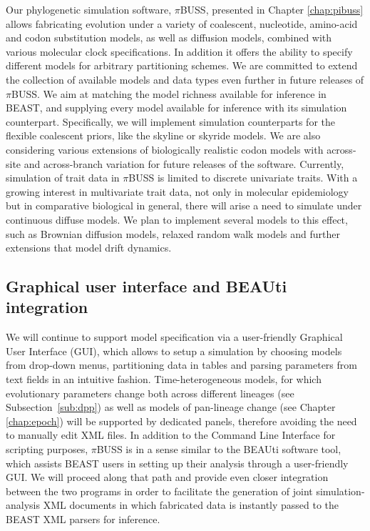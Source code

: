 Our phylogenetic simulation software, $\pi$BUSS, presented in Chapter \ref{chap:pibuss} allows fabricating evolution under a variety of coalescent, nucleotide, amino-acid and codon substitution models, as well as diffusion models, combined with various molecular clock specifications.
In addition it offers the ability to specify different models for arbitrary partitioning schemes.
We are committed to extend the collection of available models and data types even further in future releases of $\pi$BUSS.
We aim at matching the model richness available for inference in BEAST, and supplying every model available for inference with its simulation counterpart.
Specifically, we will implement simulation counterparts for the flexible coalescent priors, like the skyline \citep{Drummond2005} or skyride \citep{Minin2008b} models.
We are also considering various extensions of biologically realistic codon models with across-site and across-branch variation for future releases of the software.
Currently, simulation of trait data in $\pi$BUSS is limited to discrete univariate traits.
With a growing interest in multivariate trait data, not only in molecular epidemiology but in comparative biological in general, there will arise a need to simulate under continuous diffuse models.
We plan to implement several models to this effect, such as Brownian diffusion models, relaxed random walk models and further extensions that model drift dynamics.

\subsection{Graphical user interface and BEAUti integration}

We will continue to support model specification via a 
user-friendly Graphical User Interface (GUI), which allows to setup a simulation by choosing models from drop-down menus, partitioning data in tables and parsing parameters from text fields in an intuitive fashion.
Time-heterogeneous models, for which evolutionary parameters change both across different lineages (see Subsection~\ref{sub:dpp}) as well as models of pan-lineage change (see Chapter \ref{chap:epoch}) will be supported by dedicated panels, therefore avoiding the need to manually edit XML files.
In addition to the Command Line Interface for scripting purposes, $\pi$BUSS is in a sense similar to the BEAUti software tool, which assists BEAST users in setting up their analysis through a user-friendly GUI.
We will proceed along that path and provide even closer integration between the two programs in order to facilitate the generation of joint simulation-analysis XML documents in which fabricated data is instantly passed to the BEAST XML parsers for inference.

